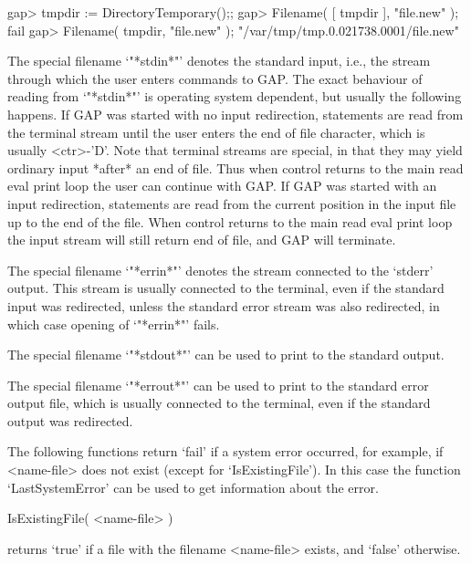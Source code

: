 \begintt
    gap> tmpdir := DirectoryTemporary();;
    gap> Filename( [ tmpdir ], "file.new" );
    fail
    gap> Filename( tmpdir, "file.new" );    
    "/var/tmp/tmp.0.021738.0001/file.new"
\endtt


The special filename `"*stdin*"'   denotes the standard input, i.e.,  the
stream   through   which the  user  enters  commands  to  GAP.  The exact
behaviour of reading from `"*stdin*"' is  operating system dependent, but
usually   the  following happens.   If  GAP   was started with  no  input
redirection, statements are read from  the terminal stream until the user
enters the end of file character, which  is usually <ctr>-'D'.  Note that
terminal streams  are  special, in   that they may  yield ordinary  input
*after* an end of file.  Thus when control returns to  the main read eval
print loop  the user can continue with  GAP.  If GAP  was started with an
input redirection, statements are read  from the current position in  the
input file up to the  end of the file.   When control returns to the main
read eval print loop the input stream will still  return end of file, and
GAP will terminate.

The  special filename `"*errin*"' denotes   the stream connected  to  the
`stderr' output.  This stream is usually connected  to the terminal, even
if  the standard input was  redirected, unless the  standard error stream
was also redirected, in which case opening of `"*errin*"' fails.
    
The special filename `"*stdout*"'  can be used to  print to  the standard
output.

The special  filename `"*errout*"' can be  used to  print to the standard
error output file, which is usually  connected  to  the terminal, even if
the standard output was redirected.
    

The  following functions  return `fail'  if a system  error occurred, for
example, if <name-file> does not exist (except for `IsExistingFile').  In
this case  the function `LastSystemError'  can be used to get information
about the error.

\>IsExistingFile( <name-file> )

returns `true'  if   a file  with the filename   <name-file>  exists, and
`false' otherwise.

